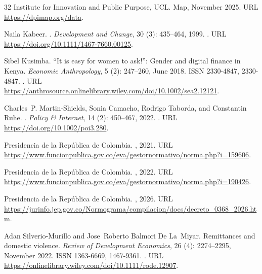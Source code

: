 \documentclass[12pt]{article}
\begin{document}
\begin{thebibliography}{32}
{Institute for Innovation and Public Purpose, UCL}.
 {Map}, November 2025.
\newblock URL \url{https://dpimap.org/data}.

Naila Kabeer.
.
\newblock \emph{Development and Change}, 30 (3): 435--464, 1999.
\newblock {}.
\newblock URL \url{https://doi.org/10.1111/1467-7660.00125}.

Sibel Kusimba.
\newblock “{It} is easy for women to ask!”: {Gender} and digital finance in {Kenya}.
\newblock \emph{Economic Anthropology}, 5 (2): 247--260, June 2018.
\newblock ISSN 2330-4847, 2330-4847.
\newblock {}.
\newblock URL \url{https://anthrosource.onlinelibrary.wiley.com/doi/10.1002/sea2.12121}.

Charles~P. Martin-Shields, Sonia Camacho, Rodrigo Taborda, and Constantin Ruhe.
.
\newblock \emph{Policy \& Internet}, 14 (2): 450--467, 2022.
\newblock {}.
\newblock URL \url{https://doi.org/10.1002/poi3.280}.

{Presidencia de la República de Colombia}.
, 2021.
\newblock URL \url{https://www.funcionpublica.gov.co/eva/gestornormativo/norma.php?i=159606}.

{Presidencia de la República de Colombia}.
, 2022.
\newblock URL \url{https://www.funcionpublica.gov.co/eva/gestornormativo/norma.php?i=190426}.

{Presidencia de la República de Colombia}.
, 2026.
\newblock URL \url{https://jurinfo.jep.gov.co/Normograma/compilacion/docs/decreto_0368_2026.htm}.

Adan Silverio‐Murillo and Jose~Roberto Balmori De La~Miyar.
\newblock Remittances and domestic violence.
\newblock \emph{Review of Development Economics}, 26 (4): 2274--2295, November 2022.
\newblock ISSN 1363-6669, 1467-9361.
\newblock {}.
\newblock URL \url{https://onlinelibrary.wiley.com/doi/10.1111/rode.12907}.


\end{thebibliography}
\end{document}
